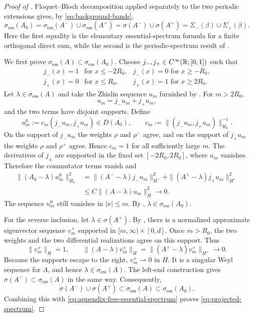 \begin{proof}[Proof of ]
Floquet--Bloch decomposition applied separately to the two periodic
extensions gives, by \eqref{eq:background-bands},
\begin{equation}
  \sigma_{\mathrm{ess}}(A_0)
  =\sigma_{\mathrm{ess}}(A^-)
   \cup\sigma_{\mathrm{ess}}(A^+)
  =\sigma(A^-)\cup\sigma(A^+)
  =\Sigma_-(\beta)\cup\Sigma_+(\beta).
  \label{eq:appendix-free-essential-spectrum}
\end{equation}
Here the first equality is the elementary essential-spectrum formula for a
finite orthogonal direct sum, while the second is the periodic-spectrum result
of \cite[Proposition~3.1, especially equations~(3.3)--(3.4)]{Fliss2013}.

We first prove
$\sigma_{\mathrm{ess}}(A)\subset\sigma_{\mathrm{ess}}(A_0)$.
Choose $j_-,j_+\in C^\infty(\mathbb{R};[0,1])$ such that
\[
\begin{array}{lll}
  j_-(x)=1&\text{for }x\leq-2R_0,&
  j_-(x)=0\text{ for }x\geq-R_0,\\
  j_+(x)=0&\text{for }x\leq R_0,&
  j_+(x)=1\text{ for }x\geq2R_0.
\end{array}
\]
Let $\lambda\in\sigma_{\mathrm{ess}}(A)$ and take the Zhislin sequence
$u_m$ furnished by .  For $m>2R_0$,
\[
  u_m=j_-u_m+j_+u_m,
\]
and the two terms have disjoint supports.  Define
\[
  u_m^0:=c_m(j_-u_m,j_+u_m)\in D(A_0),
  \qquad
  c_m:=\|(j_-u_m,j_+u_m)\|_{H_0}^{-1}.
\]
On the support of $j_-u_m$ the weights $\rho$ and $\rho^-$ agree, and on the
support of $j_+u_m$ the weights $\rho$ and $\rho^+$ agree.  Hence $c_m=1$ for
all sufficiently large $m$.  The derivatives of $j_\pm$ are supported in the
fixed set $[-2R_0,2R_0]$, where $u_m$ vanishes.  Therefore the commutator
terms vanish and
\[
\begin{aligned}
  \|(A_0-\lambda)u_m^0\|_{H_0}^2
  &=\|(A^--\lambda)j_-u_m\|_{H^-}^2
    +\|(A^+-\lambda)j_+u_m\|_{H^+}^2\\
  &\leq C\|(A-\lambda)u_m\|_H^2\longrightarrow0.
\end{aligned}
\]
The sequence $u_m^0$ still vanishes in $|x|\leq m$.  By
,
$\lambda\in\sigma_{\mathrm{ess}}(A_0)$.

For the reverse inclusion, let
$\lambda\in\sigma(A^+)$.  By
, there is a normalized approximate
eigenvector sequence $v_m^+$ supported in
$[m,\infty)\times[0,d]$.  Once $m>R_0$, the two weights and the two
differential realizations agree on this support.  Thus
\[
  \|v_m^+\|_H=1,\qquad
  \|(A-\lambda)v_m^+\|_H
  =\|(A^+-\lambda)v_m^+\|_{H^+}\longrightarrow0.
\]
Because the supports escape to the right, $v_m^+\rightharpoonup0$ in $H$.
It is a singular Weyl sequence for $A$, and hence
$\lambda\in\sigma_{\mathrm{ess}}(A)$.  The left-end construction gives
$\sigma(A^-)\subset\sigma_{\mathrm{ess}}(A)$ in the same way.  Consequently,
\[
  \sigma(A^-)\cup\sigma(A^+)
  \subset\sigma_{\mathrm{ess}}(A)
  \subset\sigma_{\mathrm{ess}}(A_0).
\]
Combining this with \eqref{eq:appendix-free-essential-spectrum} proves
\eqref{eq:projected-spectrum}.
\end{proof}
